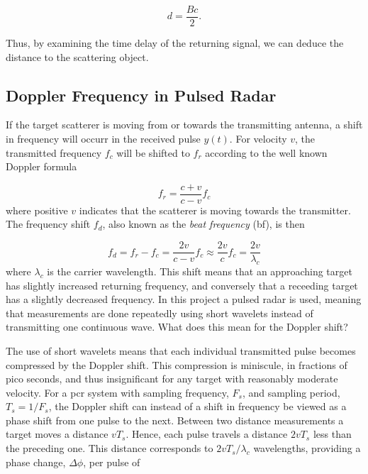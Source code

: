 \begin{equation}
	d = \frac{Bc}{2}.
\end{equation}

Thus, by examining the time delay of the returning signal, we can deduce the distance to the scattering object. 

\subsection{Doppler Frequency in Pulsed Radar}\label{sec:doppler}
\label{doppler}

If the target scatterer is moving from or towards the transmitting antenna, a shift in frequency will occurr in the received pulse $y(t)$. For velocity $v$, the transmitted frequency $f_c$ will be shifted to $f_r$ according to the well known Doppler formula \citep{ridenour_1947}

\begin{equation}
	f_r = \frac{c + v}{c - v}f_c
\end{equation}
where positive $v$ indicates that the scatterer is moving towards the transmitter. The frequency shift $f_d$, also known as the \emph{beat frequency} (\gls{bf}), is then

\begin{equation}\label{eq:dshift}
	f_d 
	= f_r - f_c 
	= \frac{2v}{c-v}f_c \approx \frac{2v}{c}f_c 
	= \frac{2v}{\lambda_c}
\end{equation}
where $\lambda_c$ is the carrier wavelength. This shift means that an approaching target has slightly increased returning frequency, and conversely that a receeding target has a slightly decreased frequency. In this project a pulsed radar is used, meaning that measurements are done repeatedly using short wavelets instead of transmitting one continuous wave. What does this mean for the Doppler shift?

The use of short wavelets means that each individual transmitted pulse becomes compressed by the Doppler shift. This compression is miniscule, in fractions of pico seconds, and thus insignificant for any target with reasonably moderate velocity. For a \gls{pcr} system with sampling frequency, $F_s$, and sampling period, $T_s = 1/F_s$, the Doppler shift can instead of a shift in frequency be viewed as a phase shift from one pulse to the next. Between two distance measurements a target moves a distance $vT_s$. Hence, each pulse travels a distance $2vT_s$ less than the preceding one. This distance corresponds to $2vT_s/\lambda_c$ wavelengths, providing a phase change, $\Delta \phi$, per pulse of

